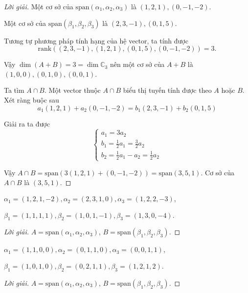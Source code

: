 \documentclass[class=linearalgebra,crop=false]{standalone}
\begin{document}
\begin{proof}[Lời giải]
    \par Một cơ sở của $\text{span}(\alpha_{1},\alpha_{2},\alpha_{3})$ là $(1,2,1), (0,-1,-2)$.
    \par Một cơ sở của $\text{span}(\beta_{1},\beta_{2},\beta_{3})$ là $(2,3,-1), (0,1,5)$.
    \par Tương tự phương pháp tính hạng của hệ vector, ta tính được
        \[ \text{rank}((2,3,-1),(1,2,1),(0,1,5),(0,-1,-2)) = 3. \]
    \par Vậy $\dim (A + B) = 3 = \dim\mathbb{C}_{3}$ nên một cơ sở của $A + B$ là $(1,0,0), (0,1,0), (0,0,1)$.
    \par Ta tìm $A\cap B$. Một vector thuộc $A\cap B$ biểu thị tuyến tính được theo $A$ hoặc $B$. Xét ràng buộc sau
        \[ a_{1}(1,2,1) + a_{2}(0,-1,-2) = b_{1}(2,3,-1) + b_{2}(0,1,5) \]
    \par Giải ra ta được
        \[
            \begin{cases}
                a_{1} = 3a_{2} \\
                b_{1} = \frac{1}{2}a_{1} = \frac{3}{2}a_{2} \\
                b_{2} = \frac{1}{2}a_{1} - a_{2} = \frac{1}{2}a_{2}
            \end{cases}
        \]
    \par Vậy $A\cap B = \text{span}(3(1,2,1) + (0,-1,-2)) = \text{span}(3,5,1)$. Cơ sở của $A\cap B$ là $(3,5,1)$.
\end{proof}

\begin{exercise}$\alpha_{1} = (1,2,1,-2), \alpha_{2} = (2,3,1,0), \alpha_{3} = (1,2,2,-3)$,
    \par $\beta_{1} = (1,1,1,1), \beta_{2} = (1,0,1,-1), \beta_{3} = (1,3,0,-4)$.
\end{exercise}

\begin{proof}[Lời giải]$A = \text{span}(\alpha_{1},\alpha_{2},\alpha_{3})$, $B = \text{span}(\beta_{1},\beta_{2},\beta_{3})$.
\end{proof}

\begin{exercise}$\alpha_{1} = (1,1,0,0), \alpha_{2} = (0,1,1,0), \alpha_{3} = (0,0,1,1)$,
    \par $\beta_{1} = (1,0,1,0), \beta_{2} = (0,2,1,1), \beta_{3} = (1,2,1,2)$.
\end{exercise}

\begin{proof}[Lời giải]$A = \text{span}(\alpha_{1},\alpha_{2},\alpha_{3})$, $B = \text{span}(\beta_{1},\beta_{2},\beta_{3})$.
\end{proof}
\end{document}
